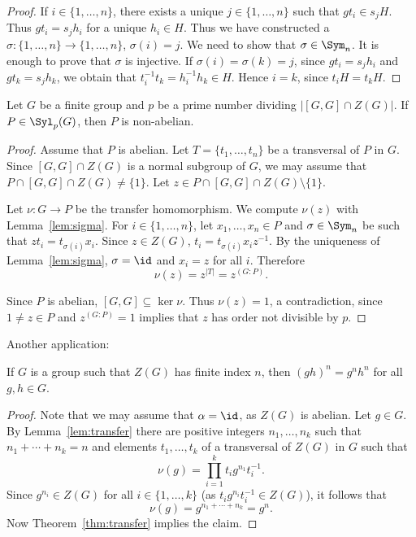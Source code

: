 \begin{proof}
	If $i\in\{1,\dots,n\}$, there exists  a unique $j\in\{1,\dots,n\}$ such that 
    $gt_i\in
	s_jH$. Thus $gt_i=s_jh_i$ for a unique $h_i\in H$. Thus we have constructed a 
	$\sigma\colon\{1,\dots,n\}\to\{1,\dots,n\}$, $\sigma(i)=j$.  We need to show that 
	$\sigma\in\Sym_n$. It is enough to prove that $\sigma$ is injective. If
	$\sigma(i)=\sigma(k)=j$, since $gt_i=s_jh_i$ and $gt_k=s_jh_k$, we obtain that 
	$t_i^{-1}t_k=h_i^{-1}h_k\in H$. Hence $i=k$, since $t_iH=t_kH$.
\end{proof}


\begin{theorem}
	\label{thm:P_nonabelian}
	Let $G$ be a finite group and $p$ be a prime number dividing $|[G,G]\cap
	Z(G)|$. If $P\in\Syl_p(G)$, then $P$ is non-abelian. 
\end{theorem}

\begin{proof}
	Assume that $P$ is abelian. Let $T=\{t_1,\dots,t_n\}$ be a transversal of $P$ in $G$. Since 
	$[G,G]\cap Z(G)$ is a normal subgroup of $G$, we may assume that 
	$P\cap [G,G]\cap Z(G)\ne\{1\}$. Let $z\in P\cap [G,G]\cap Z(G)\setminus\{1\}$. 
 
    Let $\nu\colon G\to P$ be the transfer homomorphism. We compute  
    $\nu(z)$ with Lemma~\ref{lem:sigma}. For $i\in\{1,\dots,n\}$, let 
    $x_1,\dots,x_n\in P$ and $\sigma\in\Sym_n$ be such that 
	$zt_i=t_{\sigma(i)}x_i$. Since $z\in Z(G)$, 
	$t_i=t_{\sigma(i)}x_iz^{-1}$. By the uniqueness of Lemma~\ref{lem:sigma}, 
	$\sigma=\id$ and $x_i=z$ for all $i$. Therefore  
	\[
	\nu(z)=z^{|T|}=z^{(G:P)}. 
	\]

	Since $P$ is abelian, $[G,G]\subseteq\ker\nu$. Thus $\nu(z)=1$, a contradiction, since 
    $1\ne z\in P$ and $z^{(G:P)}=1$ implies that $z$ has order not divisible by $p$. 
\end{proof}




Another application:

\begin{proposition}
	\label{pro:center}
	If $G$ is a group such that $Z(G)$ has finite index $n$, then
	$(gh)^n=g^nh^n$ for all $g,h\in G$.	
\end{proposition}

\begin{proof}
	Note that we may assume that $\alpha=\id$, as $Z(G)$ is
	abelian. Let $g\in G$. By Lemma~\ref{lem:transfer} there are positive integers 
    $n_1,\dots,n_k$ such that $n_1+\cdots+n_k=n$ and elements 
	$t_1,\dots,t_k$ of a transversal of $Z(G)$ in $G$ such that 
	\[
		\nu(g)=\prod_{i=1}^k t_ig^{n_1}t_i^{-1}.
	\]
	Since $g^{n_i}\in Z(G)$ for all $i\in\{1,\dots,k\}$ (as $t_ig^{n_i}t_i^{-1}\in Z(G)$), 
	it follows that 
	\[
	\nu(g)=g^{n_1+\cdots+n_k}=g^n.
	\]
	Now Theorem~\ref{thm:transfer} implies the claim.
\end{proof}

